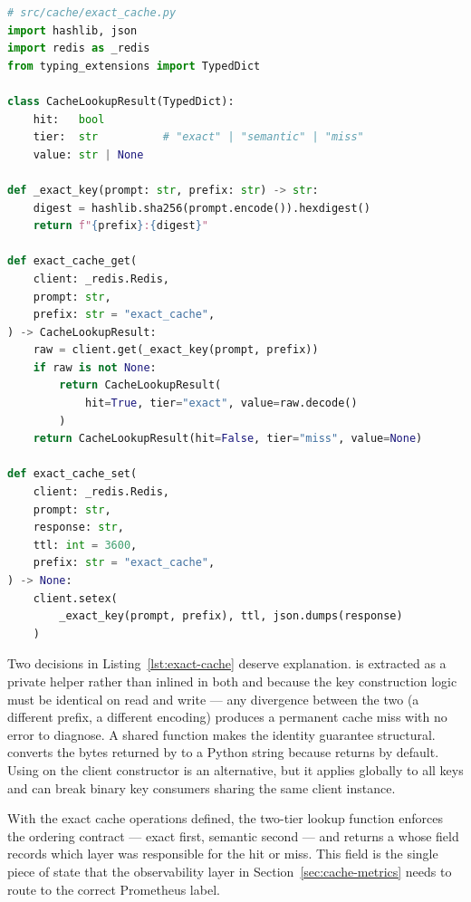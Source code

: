 \begin{lstlisting}[language=Python,
  caption={CacheLookupResult and exact cache read/write operations},
  label={lst:exact-cache}]
# src/cache/exact_cache.py
import hashlib, json
import redis as _redis
from typing_extensions import TypedDict

class CacheLookupResult(TypedDict):
    hit:   bool
    tier:  str          # "exact" | "semantic" | "miss"
    value: str | None

def _exact_key(prompt: str, prefix: str) -> str:
    digest = hashlib.sha256(prompt.encode()).hexdigest()
    return f"{prefix}:{digest}"

def exact_cache_get(
    client: _redis.Redis,
    prompt: str,
    prefix: str = "exact_cache",
) -> CacheLookupResult:
    raw = client.get(_exact_key(prompt, prefix))
    if raw is not None:
        return CacheLookupResult(
            hit=True, tier="exact", value=raw.decode()
        )
    return CacheLookupResult(hit=False, tier="miss", value=None)

def exact_cache_set(
    client: _redis.Redis,
    prompt: str,
    response: str,
    ttl: int = 3600,
    prefix: str = "exact_cache",
) -> None:
    client.setex(
        _exact_key(prompt, prefix), ttl, json.dumps(response)
    )
\end{lstlisting}

Two decisions in Listing~\ref{lst:exact-cache} deserve explanation.
 is extracted as a private helper rather than
inlined in both  and 
because the key construction logic must be identical on read and write
--- any divergence between the two (a different prefix, a different
encoding) produces a permanent cache miss with no error to diagnose. A
shared function makes the identity guarantee structural. 
converts the bytes returned by  to a Python
string because  returns  by default. Using
 on the client constructor is an
alternative, but it applies globally to all keys and can break binary
key consumers sharing the same client instance.

With the exact cache operations defined, the two-tier lookup function
enforces the ordering contract --- exact first, semantic second --- and
returns a  whose  field records which
layer was responsible for the hit or miss. This  field is the
single piece of state that the observability layer in
Section~\ref{sec:cache-metrics} needs to route to the correct Prometheus
label.

